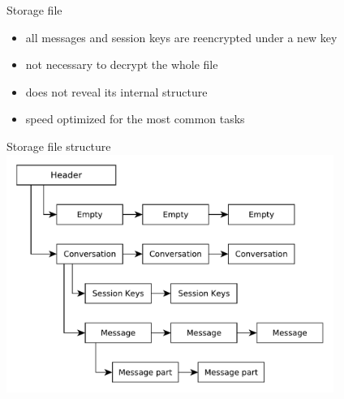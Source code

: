 \documentclass{beamer}
\begin{document}

%


\begin{frame}{Storage file}
	\begin{itemize}
		\item{all messages and session keys are reencrypted under a new key}
		\item{not necessary to decrypt the whole file}
		\item{does not reveal its internal structure}
		\item{speed optimized for the most common tasks}
	\end{itemize}
\end{frame}

\begin{frame}{Storage file structure}
	\centering
	\includegraphics[width=0.8\textwidth]{storage_file}
\end{frame}
\end{document}
